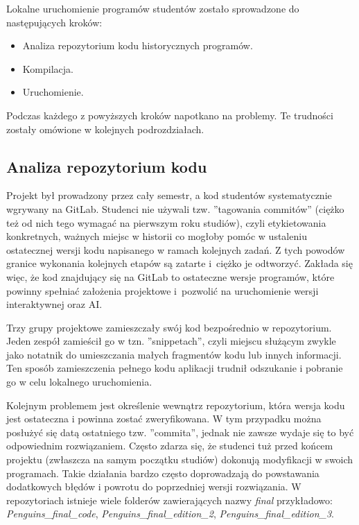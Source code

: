 Lokalne uruchomienie programów studentów zostało sprowadzone do następujących kroków:
\begin{itemize}
    \item Analiza repozytorium kodu historycznych programów.
    \item Kompilacja.
    \item Uruchomienie.
\end{itemize}

Podczas każdego z powyższych kroków napotkano na problemy.
Te trudności zostały omówione w kolejnych podrozdziałach.

\subsection{Analiza repozytorium kodu}

Projekt był prowadzony przez cały semestr, a kod studentów systematycznie wgrywany na GitLab.
Studenci nie używali tzw. ”tagowania commitów” (ciężko też od nich tego wymagać na pierwszym roku studiów), czyli etykietowania konkretnych, ważnych miejsc w historii co mogłoby pomóc w ustaleniu ostatecznej wersji kodu napisanego w ramach kolejnych zadań.
Z tych powodów granice wykonania kolejnych etapów są zatarte i~ciężko je odtworzyć.
Zakłada się więc, że kod znajdujący się na GitLab to ostateczne wersje programów, które powinny spełniać założenia projektowe i~pozwolić na uruchomienie wersji interaktywnej oraz AI.

Trzy grupy projektowe zamieszczały swój kod bezpośrednio w repozytorium.
Jeden zespół zamieścił go w tzn. ”snippetach”, czyli miejscu służącym zwykle jako notatnik do umieszczania małych fragmentów kodu lub innych informacji.
Ten sposób zamieszczenia pełnego kodu aplikacji trudnił odszukanie i pobranie go w celu lokalnego uruchomienia.

Kolejnym problemem jest określenie wewnątrz repozytorium, która wersja kodu jest ostateczna i powinna zostać zweryfikowana.
W tym przypadku można posłużyć się datą ostatniego tzw. ”commita”, jednak nie zawsze wydaje się to być odpowiednim rozwiązaniem.
Często zdarza się, że studenci tuż przed końcem projektu (zwłaszcza na samym początku studiów) dokonują modyfikacji w swoich programach.
Takie działania bardzo często doprowadzają do powstawania dodatkowych błędów i powrotu do poprzedniej wersji rozwiązania.
W repozytoriach istnieje wiele folderów zawierających nazwy \textit{final} przykładowo: \textit{Penguins\_final\_code}, \textit{Penguins\_final\_edition\_2}, \textit{Penguins\_final\_edition\_3}.

